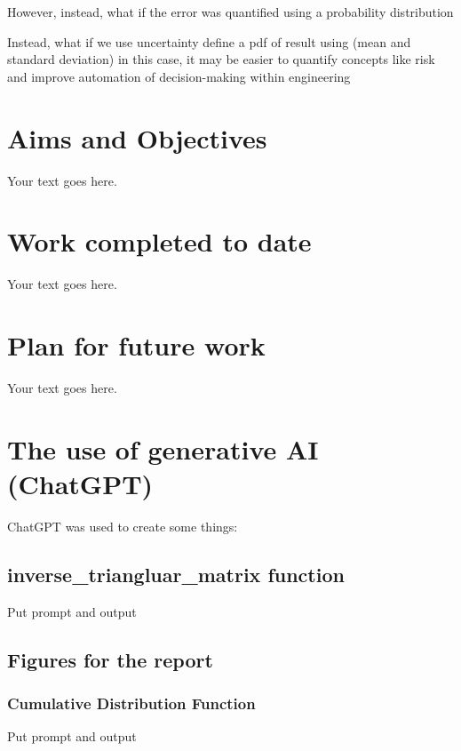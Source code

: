 \documentclass[12pt]{article}
\begin{document}
    However, instead, what if the error was quantified using a probability distribution

    Instead, what if we use uncertainty define a pdf of result using (mean and standard deviation)
    in this case, it may be easier to quantify concepts like risk and improve automation of decision-making within engineering
    \subsection{}

    \section{Aims and Objectives}
    Your text goes here.

    \section{Work completed to date}
    Your text goes here. \cite{q-candela}
    \section{Plan for future work}
    Your text goes here.

    \appendix
    \section{The use of generative AI (ChatGPT)}
    ChatGPT was used to create some things:
    \subsection{inverse_triangluar_matrix function}
    Put prompt and output
    \subsection{Figures for the report}
    \subsubsection{Cumulative Distribution Function}
    Put prompt and output


    \printbibliography
\end{document}
